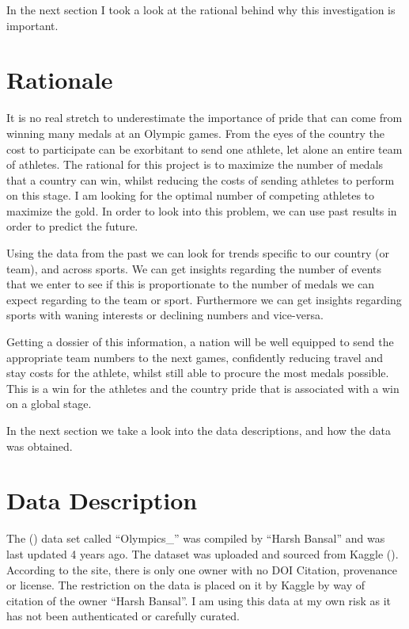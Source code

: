 \documentclass[
]{article}
\begin{document}
In the next section I took a look at the rational behind why this investigation is important.

\section*{Rationale}\label{rationale}

It is no real stretch to underestimate the importance of pride that can come from winning many medals at an Olympic games. From the eyes of the country the cost to participate can be exorbitant to send one athlete, let alone an entire team of athletes. The rational for this project is to maximize the number of medals that a country can win, whilst reducing the costs of sending athletes to perform on this stage. I am looking for the optimal number of competing athletes to maximize the gold. In order to look into this problem, we can use past results in order to predict the future.

Using the data from the past we can look for trends specific to our country (or team), and across sports. We can get insights regarding the number of events that we enter to see if this is proportionate to the number of medals we can expect regarding to the team or sport. Furthermore we can get insights regarding sports with waning interests or declining numbers and vice-versa.

Getting a dossier of this information, a nation will be well equipped to send the appropriate team numbers to the next games, confidently reducing travel and stay costs for the athlete, whilst still able to procure the most medals possible. This is a win for the athletes and the country pride that is associated with a win on a global stage.

In the next section we take a look into the data descriptions, and how the data was obtained.

\newpage

\section*{Data Description}\label{data-description}

The () data set called ``Olympics\_'' was compiled by ``Harsh Bansal'' and was last updated 4 years ago. The dataset was uploaded and sourced from Kaggle (). According to the site, there is only one owner with no DOI Citation, provenance or license. The restriction on the data is placed on it by Kaggle by way of citation of the owner ``Harsh Bansal''. I am using this data at my own risk as it has not been authenticated or carefully curated.
\end{document}
